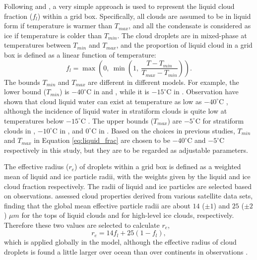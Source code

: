 Following \citet{Ose1993} and \citet{Boville2006}, a very simple approach is used to represent the liquid cloud fraction ($f_l$) within a grid box. Specifically, all clouds are assumed to be in liquid form if temperature is warmer than $T_{max}$, and all the condensate is considered as ice if temperature is colder than $T_{min}$. The cloud droplets are in mixed-phase at temperatures between $T_{min}$ and $T_{max}$, and the proportion of liquid cloud in a grid box is defined as a linear function of temperature:
\begin{equation}
	f_{l} =\max\left(0, ~\min\left(1, ~\frac{T-T_{min}}{T_{max}-T_{min}} \right)\right).
	\label{eq:liquid_frac}
\end{equation}
The bounds $T_{min}$ and $T_{max}$ are different in different models. For example, the lower bound ($T_{min}$) is $-40^{\circ}$C in \citet{Ose1993} and \citet{Boville2006}, while it is $-15^{\circ}$C  in \citet{Smith1990}. Observation have shown that cloud liquid water can exist at temperature as low as $-40^{\circ}$C \citep{Heymsfield1993}, although the incidence of liquid water in stratiform clouds is quite low at temperatures below $-15^{\circ}$C \citep{Ryan1996}. The upper bounds ($T_{max}$) are $-5^{\circ}$C for stratiform clouds in \citet{Ose1993}, $-10^{\circ}$C in \citet{Boville2006}, and $0^{\circ}$C in \citet{Smith1990}. Based on the choices in previous studies, $T_{min}$ and $T_{max}$ in Equation \eqref{eq:liquid_frac} are chosen to be $-40^{\circ}$C and $-5^{\circ}$C respectively in this study, but they are to be regarded as adjustable parameters.

The effective radius ($r_{e}$) of droplets within a grid box is defined as a weighted mean of liquid and ice particle radii, with the weights given by the liquid and ice cloud fraction respectively. The radii of liquid and ice particles are selected based on observations. \citet{Stubenrauch2013} assessed cloud properties derived from various satellite data sets, finding that the global mean effective particle radii are about $14$ ($\pm1$) and $25$ ($\pm2$) $\mu m$ for the tops of liquid clouds and for high-level ice clouds, respectively. Therefore these two values are selected to calculate $r_e$,
\begin{equation}
	r_e = 14f_l + 25(1-f_l),
	\label{eq:Reff}
\end{equation}
which is applied globally in the model, although the effective radius of cloud droplets is found a little larger over ocean than over continents in observations \citep{Stubenrauch2013}.


